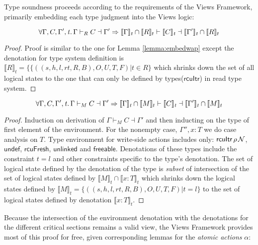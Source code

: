 Type soundness proceeds according to the requirements of the Views Framework, primarily embedding each type judgment into the Views logic:
\begin{lemma}
  \label{lemma:embedrap}
\[  \forall\Gamma,C,\Gamma',\mathit{t}\ldotp\Gamma\vdash_R C\dashv \Gamma' \Rightarrow
\llbracket\Gamma\rrbracket_\mathit{t}\cap\llbracket{R}\rrbracket_t\vdash \llbracket C\rrbracket_\mathit{t}\dashv\llbracket\Gamma'\rrbracket_\mathit{t}\cap\llbracket{R}\rrbracket_t
\]
\end{lemma}
\begin{proof}
  Proof is similar to the one for Lemma \ref{lemma:embedwap} except the denotation for type system definition is $\llbracket R \rrbracket_t = \{\{((s,h,l,rt,R,B),O,U,T,F)| t \in R \}$ which shrinks down the set of all logical states to the one that can only be defined by types($\textsf{rcuItr}$) in read type system. 
  \end{proof}
\begin{lemma}
  \label{lemma:embedwap}
  \[
\forall\Gamma,C,\Gamma',\mathit{t}\ldotp\Gamma\vdash_M C\dashv \Gamma' \Rightarrow
\llbracket\Gamma\rrbracket_\mathit{t}\cap\llbracket{M}\rrbracket_t\vdash \llbracket C\rrbracket_\mathit{t}\dashv\llbracket\Gamma'\rrbracket_\mathit{t}\cap\llbracket{M}\rrbracket_t
\]
\end{lemma}
\begin{proof}
  Induction on derivation of $\Gamma \vdash_M C \dashv \Gamma'$ and then inducting on the type of first element of the environment. For the nonempty case, $\Gamma'',x:T$ we do case analysis on $T$. Type environment for write-side actions includes only: $\textsf{rcuItr} \, \rho \, \mathcal{N}$, $\textsf{undef}$, $\textsf{rcuFresh}$, $\textsf{unlinked}$ and $\textsf{freeable}$. Denotations of these types include the constraint $t=l$ and other constraints specific to the type's denotation. The set of logical state defined by the denotation of the type is \emph{subset} of intersection of the set of logical states defined by $\llbracket M \rrbracket_{t} \cap \llbracket x:T \rrbracket_{t}$ which shrinks down the logical states defined by  $\llbracket M \rrbracket_{t}= \{((s,h,l,rt,R,B),O,U,T,F)| t = l\}$ to the set of logical states defined by denotation $\llbracket x:T \rrbracket_t$.
  \end{proof}
Because the intersection of the environment denotation with the denotations for the different critical sections remains a valid view, the Views Framework provides most of this proof for free, given corresponding lemmas for the \emph{atomic actions} $\alpha$:

